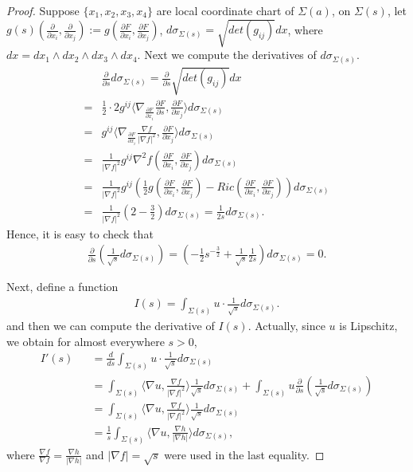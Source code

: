 \documentclass[12pt]{amsart}
\newcommand{\ban}{\begin{eqnarray*}}
\newcommand{\ean}{\end{eqnarray*}}
\begin{document}
\begin{proof}
	\smallskip
	Suppose $\{x_1, x_2, x_3, x_4\}$ are local coordinate chart of $\Sigma(a)$, on $\Sigma(s)$, let  $g(s)(\frac{\partial }{\partial x_i}, \frac{\partial}{\partial x_j}):=g(\frac{\partial F}{\partial x_i}, \frac{\partial F}{\partial x_j})$, $d\sigma_{\Sigma(s)}=\sqrt{det(g_{ij})}dx$, where $dx=dx_1\wedge dx_2\wedge dx_3\wedge dx_4$.
	Next we compute the derivatives of $d\sigma_{\Sigma(s)}$.
	\begin{align*}
		&\frac{\partial}{\partial s}d\sigma_{\Sigma(s)}=\frac{\partial}{\partial s}\sqrt{det(g_{ij})}dx\\
		=&\frac{1}{2}\cdot 2 g^{ij}\langle \nabla_{\frac{\partial F}{\partial x_i}}\frac{\partial F}{\partial s}, \frac{\partial F}{\partial x_j}\rangle d\sigma_{\Sigma(s)}\\
		=& g^{ij}\langle \nabla_{\frac{\partial F}{\partial x_i}}\frac{\nabla f}{|\nabla f|^2}, \frac{\partial F}{\partial x_j}\rangle d\sigma_{\Sigma(s)}\\
		=&\frac{1}{|\nabla f|^2}g^{ij}\nabla^2 f(\frac{\partial F}{\partial x_i}, \frac{\partial F}{\partial x_j})d\sigma_{\Sigma(s)}\\
		=&\frac{1}{|\nabla f|^2} g^{ij}\left(\frac{1}{2}g(\frac{\partial F}{\partial x_i}, \frac{\partial F}{\partial x_j})-Ric(\frac{\partial F}{\partial x_i}, \frac{\partial F}{\partial x_j})\right)d\sigma_{\Sigma(s)}\\
		=&\frac{1}{|\nabla f|^2} (2-\frac{3}{2})d\sigma_{\Sigma(s)}=\frac{1}{2s}d\sigma_{\Sigma(s)}.
	\end{align*}
	Hence, it is easy to check that
	\ban
	\frac{\partial}{\partial s}\left(\frac{1}{\sqrt{s}}d\sigma_{\Sigma(s)}\right)=\left(-\frac{1}{2}s^{-\frac{3}{2}}+\frac{1}{\sqrt{s}}\frac{1}{2s}\right) d\sigma_{\Sigma(s)}=0.
	\ean
	
	Next, define a function
	\ban
	I(s)=\int_{\Sigma(s)} u\cdot \frac{1}{\sqrt{s}} d\sigma_{\Sigma(s)}.
	\ean
	and then we can compute the derivative of $I(s)$. Actually, since $u$ is Lipschitz, we obtain for almost everywhere $s>0$,
	\ban
	I'(s)&&=\frac{d}{ds}\int_{\Sigma(s)} u\cdot \frac{1}{\sqrt{s}} d\sigma_{\Sigma(s)}\\
	&&=\int_{\Sigma(s)} \langle \nabla u, \frac{\nabla f}{|\nabla f|^2}\rangle \frac{1}{\sqrt{s}}d\sigma_{\Sigma(s)}+\int_{\Sigma(s)} u\frac{\partial}{\partial s}\left(\frac{1}{\sqrt{s}}d\sigma_{\Sigma(s)}\right)\\
	&&=\int_{\Sigma(s)} \langle \nabla u, \frac{\nabla f}{|\nabla f|^2}\rangle \frac{1}{\sqrt{s}}d\sigma_{\Sigma(s)}\\
	&&=\frac{1}{s}\int_{\Sigma(s)} \langle \nabla u, \frac{\nabla h}{|\nabla h|}\rangle d\sigma_{\Sigma(s)},
	\ean
	where $\frac{\nabla f}{\nabla f}=\frac{\nabla h}{|\nabla h|}$ and $|\nabla f|=\sqrt{s}$ were used in the last equality.
	

\end{proof}
\end{document}
